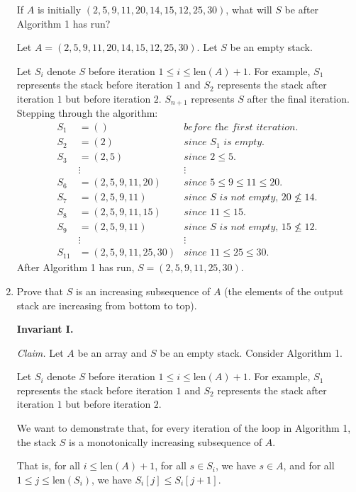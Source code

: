 \begin{enumerate}
    If $A$ is initially $(2,5,9,11,20,14,15,12,25,30)$, what will $S$ be after Algorithm 1 has run?
\begin{solution}
Let $A=(2,5,9,11,20,14,15,12,25,30)$. Let $S$ be an empty stack. 

Let $S_i$ denote $S$ before iteration $1\leq i\leq\text{len}(A)+1$. For example, $S_1$ represents the stack before iteration $1$ and $S_2$ represents the stack after iteration $1$ but before iteration $2$. $S_{n+1}$ represents $S$ after the final iteration. Stepping through the algorithm:
\begin{align*}
S_1&=()&\textit{before the first iteration.}\\
S_2&=(2)&\textit{since $S_1$ is empty.}\\
S_3&=(2,5)&\textit{since $2\leq 5$.}\\
~&\vdots&\vdots\\
S_6&=(2,5,9,11,20)&\textit{since $5\leq 9\leq 11\leq 20$.}\\
S_7&=(2,5,9,11)&\textit{since $S$ is not empty, $20\nleq 14$.}\\
S_8&=(2,5,9,11,15)&\textit{since $11\leq 15$.}\\
S_9&=(2,5,9,11)&\textit{since $S$ is not empty, $15\nleq 12$.}\\
~&\vdots&\vdots\\
S_{11}&=(2,5,9,11,25,30)&\textit{since $11\leq 25\leq 30$.}
\end{align*}
After Algorithm 1 has run, $S=(2,5,9,11,25,30)$.
\end{solution}
\item Prove that $S$ is an increasing subsequence of $A$ (the elements of the output stack are increasing from bottom to top).
\begin{solution}\textbf{Invariant I.}

\textit{Claim. }Let $A$ be an array and $S$ be an empty stack. Consider Algorithm 1.

Let $S_i$ denote $S$ before iteration $1\leq i\leq\text{len}(A)+1$. For example, $S_1$ represents the stack before iteration $1$ and $S_2$ represents the stack after iteration $1$ but before iteration $2$. 

We want to demonstrate that, for every iteration of the loop in Algorithm 1, the stack $S$ is a monotonically increasing subsequence of $A$.

That is, for all $i\leq\text{len}(A)+1$, for all $s\in S_i$, we have $s\in A$, and for all $1\leq j\leq\text{len}(S_i)$, we have $S_i[j]\leq S_i[j+1]$.


\end{solution}
\end{enumerate}
